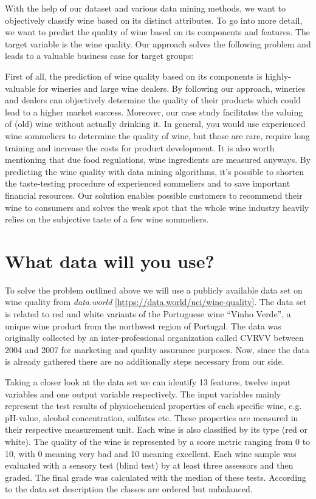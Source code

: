 \documentclass[11pt,titlepage,oneside,openany]{article}
\begin{document}
With the help of our dataset and various data mining methods, we want to objectively classify wine based on its distinct attributes. To go into more detail, we want to predict the quality of wine based on its components and features. The target variable is the wine quality. Our approach solves the following problem and leads to a valuable business case for target groups:

First of all, the prediction of wine quality based on its components is highly-valuable for wineries and large wine dealers. By following our approach, wineries and dealers can objectively determine the quality of their products which could lead to a higher market success. Moreover, our case study facilitates the valuing of (old) wine without actually drinking it. In general, you would use experienced wine sommeliers to determine the quality of wine, but those are rare, require long training and increase the costs for product development. It is also worth mentioning that due food regulations, wine ingredients are measured anyways. By predicting the wine quality with data mining algorithms, it’s possible to shorten the taste-testing procedure of experienced sommeliers and to save important financial resources. Our solution enables possible customers to recommend their wine to consumers and solves the weak spot that the whole wine industry heavily relies on the subjective taste of a few wine sommeliers.

\section{What data will you use?}
To solve the problem outlined above we will use a publicly available data set on wine quality from \textit{data.world} [\url{https://data.world/uci/wine-quality}]. The data set is related to red and white variants of the Portuguese wine “Vinho Verde”, a unique wine product from the northwest region of Portugal. The data was originally collected by an inter-professional organization called CVRVV between 2004 and 2007 for marketing and quality assurance purposes. Now, since the data is already gathered there are no additionally steps necessary from our side. 

Taking a closer look at the data set we can identify 13 features, twelve input variables and one output variable respectively. The input variables mainly represent the test results of physiochemical properties of each specific wine, e.g. pH-value, alcohol concentration, sulfates etc. These properties are measured in their respective measurement unit. Each wine is also classified by its type (red or white). The quality of the wine is represented by a score metric ranging from 0 to 10, with 0 meaning very bad and 10 meaning excellent. Each wine sample was evaluated with a sensory test (blind test) by at least three assessors and then graded. The final grade was calculated with the median of these tests. According to the data set description the classes are ordered but unbalanced.
\end{document}
